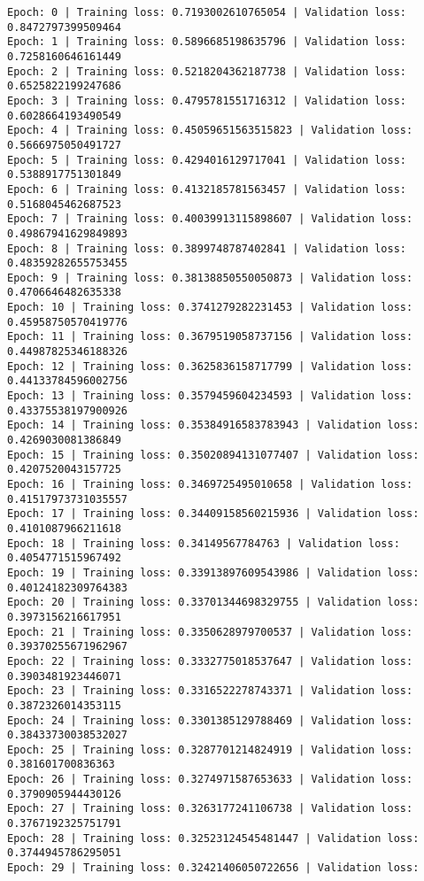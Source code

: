 \documentclass[11pt]{article}
\begin{document}
    \begin{Verbatim}[commandchars=\\\{\}]
Epoch: 0 | Training loss: 0.7193002610765054 | Validation loss:
0.8472797399509464
Epoch: 1 | Training loss: 0.5896685198635796 | Validation loss:
0.7258160646161449
Epoch: 2 | Training loss: 0.5218204362187738 | Validation loss:
0.6525822199247686
Epoch: 3 | Training loss: 0.4795781551716312 | Validation loss:
0.6028664193490549
Epoch: 4 | Training loss: 0.45059651563515823 | Validation loss:
0.5666975050491727
Epoch: 5 | Training loss: 0.4294016129717041 | Validation loss:
0.5388917751301849
Epoch: 6 | Training loss: 0.4132185781563457 | Validation loss:
0.5168045462687523
Epoch: 7 | Training loss: 0.40039913115898607 | Validation loss:
0.49867941629849893
Epoch: 8 | Training loss: 0.3899748787402841 | Validation loss:
0.48359282655753455
Epoch: 9 | Training loss: 0.38138850550050873 | Validation loss:
0.4706646482635338
Epoch: 10 | Training loss: 0.3741279282231453 | Validation loss:
0.45958750570419776
Epoch: 11 | Training loss: 0.3679519058737156 | Validation loss:
0.44987825346188326
Epoch: 12 | Training loss: 0.3625836158717799 | Validation loss:
0.44133784596002756
Epoch: 13 | Training loss: 0.3579459604234593 | Validation loss:
0.43375538197900926
Epoch: 14 | Training loss: 0.35384916583783943 | Validation loss:
0.4269030081386849
Epoch: 15 | Training loss: 0.35020894131077407 | Validation loss:
0.4207520043157725
Epoch: 16 | Training loss: 0.3469725495010658 | Validation loss:
0.41517973731035557
Epoch: 17 | Training loss: 0.34409158560215936 | Validation loss:
0.4101087966211618
Epoch: 18 | Training loss: 0.34149567784763 | Validation loss:
0.4054771515967492
Epoch: 19 | Training loss: 0.33913897609543986 | Validation loss:
0.40124182309764383
Epoch: 20 | Training loss: 0.33701344698329755 | Validation loss:
0.3973156216617951
Epoch: 21 | Training loss: 0.3350628979700537 | Validation loss:
0.39370255671962967
Epoch: 22 | Training loss: 0.3332775018537647 | Validation loss:
0.3903481923446071
Epoch: 23 | Training loss: 0.3316522278743371 | Validation loss:
0.3872326014353115
Epoch: 24 | Training loss: 0.3301385129788469 | Validation loss:
0.38433730038532027
Epoch: 25 | Training loss: 0.3287701214824919 | Validation loss:
0.381601700836363
Epoch: 26 | Training loss: 0.3274971587653633 | Validation loss:
0.3790905944430126
Epoch: 27 | Training loss: 0.3263177241106738 | Validation loss:
0.3767192325751791
Epoch: 28 | Training loss: 0.32523124545481447 | Validation loss:
0.3744945786295051
Epoch: 29 | Training loss: 0.32421406050722656 | Validation loss:

\end{Verbatim}
\end{document}
